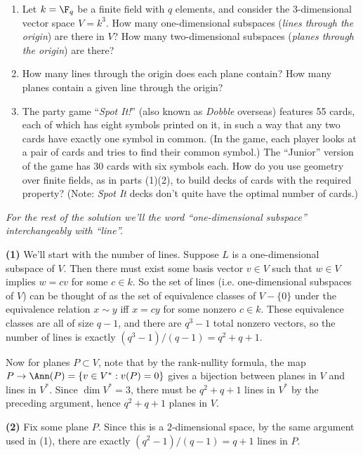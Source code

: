 \begin{problem}
  \noindent
  \begin{enumerate}
    \item Let $k=\F_q$ be a finite field with $q$ elements, and consider the $3$-dimensional vector space $V=k^3$. How many one-dimensional subspaces ({\em lines through the origin}) are there in $V$? How many two-dimensional subspaces ({\em planes through the origin}) are there?
    \item How many lines through the origin does each plane contain? How many
    planes contain a given line through the origin?
    \item The party game ``{\em Spot It!}'' (also known as {\em Dobble} overseas) features 55 cards, each of which has eight symbols printed on it, in such a way that any two cards have exactly one symbol in common. (In the game, each player looks at a pair of cards and tries to find their common symbol.) The ``Junior'' version of the game has 30 cards with six symbols each. How do you use geometry over finite fields, as in parts (1)(2), to build decks of cards with the required property? (Note: {\em Spot It} decks don't quite have the optimal number of cards.)
  \end{enumerate}
\end{problem}

\textit{For the rest of the solution we'll the word ``one-dimensional subspace'' interchangeably with ``line''.}

\textbf{(1)} We'll start with the number of lines. Suppose $L$ is a one-dimensional subspace of $V$. Then there must exist some basis vector $v\in V$ such that $w\in V$ implies $w=cv$ for some $c\in k$. So the set of lines (i.e. one-dimensional subspaces of $V$) can be thought of as the set of equivalence classes of $V-\{0\}$ under the equivalence relation $x\sim y$ iff $x=cy$ for some nonzero $c\in k$. These equivalence classes are all of size $q-1$, and there are $q^3-1$ total nonzero vectors, so the number of lines is exactly $(q^3-1) /(q-1)=q^2+q+1$.     

Now for planes $P\subset V$, note that by the rank-nullity formula, the map $P \to \Ann(P)=\{v\in V^* : v(P)=0\}$ gives a bijection between planes in $V$ and lines in $V^*$. Since $\dim V^*=3$, there must be $q^2+q+1$ lines in $V^*$ by the preceding argument, hence $q^2+q+1$ planes in $V$.  

\textbf{(2)} Fix some plane $P$. Since this is a $2$-dimensional space, by the same argument used in (1), there are exactly $(q^2-1) /(q-1)=q+1$ lines in $P$.

